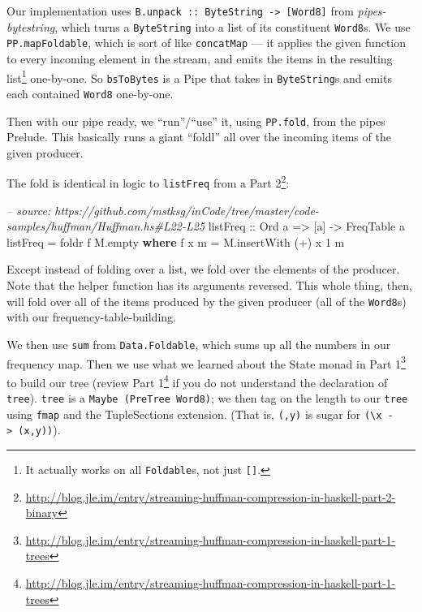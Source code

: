 \documentclass[]{article}
\newenvironment{Shaded}{}{}
\newcommand{\KeywordTok}[1]{\textcolor[rgb]{0.00,0.44,0.13}{\textbf{#1}}}
\newcommand{\DataTypeTok}[1]{\textcolor[rgb]{0.56,0.13,0.00}{#1}}
\newcommand{\DecValTok}[1]{\textcolor[rgb]{0.25,0.63,0.44}{#1}}
\newcommand{\CommentTok}[1]{\textcolor[rgb]{0.38,0.63,0.69}{\textit{#1}}}
\newcommand{\OtherTok}[1]{\textcolor[rgb]{0.00,0.44,0.13}{#1}}
\newcommand{\FunctionTok}[1]{\textcolor[rgb]{0.02,0.16,0.49}{#1}}
\newcommand{\NormalTok}[1]{#1}
\renewcommand{\href}[2]{#2\footnote{\url{#1}}}
\begin{document}
Our implementation uses
\texttt{B.unpack\ ::\ ByteString\ -\textgreater{}\ {[}Word8{]}} from
\emph{pipes-bytestring}, which turns a \texttt{ByteString} into a list of its
constituent \texttt{Word8}s. We use \texttt{PP.mapFoldable}, which is sort of
like \texttt{concatMap} --- it applies the given function to every incoming
element in the stream, and emits the items in the resulting list\footnote{It
  actually works on all \texttt{Foldable}s, not just \texttt{{[}{]}}.}
one-by-one. So \texttt{bsToBytes} is a Pipe that takes in \texttt{ByteString}s
and emits each contained \texttt{Word8} one-by-one.

Then with our pipe ready, we ``run''/``use'' it, using \texttt{PP.fold}, from
the pipes Prelude. This basically runs a giant ``foldl'' all over the incoming
items of the given producer.

The fold is identical in logic to \texttt{listFreq} from a
\href{http://blog.jle.im/entry/streaming-huffman-compression-in-haskell-part-2-binary}{Part
2}:

\begin{Shaded}
\begin{Highlighting}[]
\CommentTok{-- source: https://github.com/mstksg/inCode/tree/master/code-samples/huffman/Huffman.hs#L22-L25}
\OtherTok{listFreq ::} \DataTypeTok{Ord}\NormalTok{ a }\OtherTok{=>}\NormalTok{ [a] }\OtherTok{->} \DataTypeTok{FreqTable}\NormalTok{ a}
\NormalTok{listFreq }\FunctionTok{=}\NormalTok{ foldr f M.empty}
  \KeywordTok{where}
\NormalTok{    f x m }\FunctionTok{=}\NormalTok{ M.insertWith (}\FunctionTok{+}\NormalTok{) x }\DecValTok{1}\NormalTok{ m}
\end{Highlighting}
\end{Shaded}

Except instead of folding over a list, we fold over the elements of the
producer. Note that the helper function has its arguments reversed. This whole
thing, then, will fold over all of the items produced by the given producer (all
of the \texttt{Word8}s) with our frequency-table-building.

We then use \texttt{sum} from \texttt{Data.Foldable}, which sums up all the
numbers in our frequency map. Then we use what we learned about the State monad
in
\href{http://blog.jle.im/entry/streaming-huffman-compression-in-haskell-part-1-trees}{Part
1} to build our tree (review
\href{http://blog.jle.im/entry/streaming-huffman-compression-in-haskell-part-1-trees}{Part
1} if you do not understand the declaration of \texttt{tree}). \texttt{tree} is
a \texttt{Maybe\ (PreTree\ Word8)}; we then tag on the length to our
\texttt{tree} using \texttt{fmap} and the TupleSections extension. (That is,
\texttt{(,y)} is sugar for
\texttt{(\textbackslash{}x\ -\textgreater{}\ (x,y))}).
\end{document}
